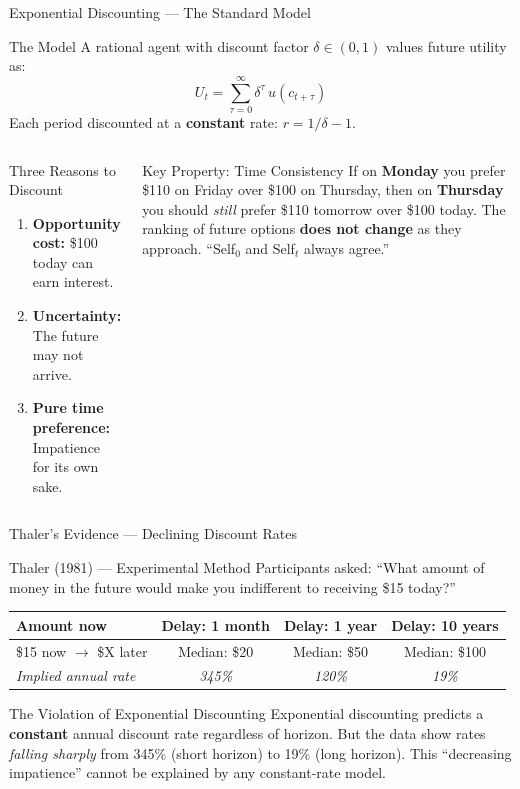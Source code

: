 \documentclass[aspectratio=169]{beamer}
\begin{document}
\begin{frame}{Exponential Discounting --- The Standard Model}
\begin{block}{The Model}
A rational agent with discount factor $\delta \in (0,1)$ values future utility as:
\[
  U_t = \sum_{\tau=0}^{\infty} \delta^\tau \, u(c_{t+\tau})
\]
Each period discounted at a \textbf{constant} rate: $r = 1/\delta - 1$.
\end{block}
\begin{columns}
\begin{block}{Three Reasons to Discount}
\begin{enumerate}
  \item \textbf{Opportunity cost:} \$100 today can earn interest.
  \item \textbf{Uncertainty:} The future may not arrive.
  \item \textbf{Pure time preference:} Impatience for its own sake.
\end{enumerate}
\end{block}
\begin{block}{Key Property: Time Consistency}
If on \textbf{Monday} you prefer \$110 on Friday over \$100 on Thursday, then on \textbf{Thursday} you should \textit{still} prefer \$110 tomorrow over \$100 today. The ranking of future options \textbf{does not change} as they approach. ``Self$_0$ and Self$_t$ always agree.''
\end{block}
\end{columns}
\end{frame}

\begin{frame}{Thaler's Evidence --- Declining Discount Rates}
\begin{block}{Thaler (1981) --- Experimental Method}
Participants asked: ``What amount of money in the future would make you indifferent to receiving \$15 today?''
\end{block}
\medskip
\begin{center}
\begin{tabular}{lccc}
\toprule
\textbf{Amount now} & \textbf{Delay: 1 month} & \textbf{Delay: 1 year} & \textbf{Delay: 10 years}\\
\midrule
\$15 now $\to$ \$X later & Median: \$20 & Median: \$50 & Median: \$100\\[0.3em]
\textit{Implied annual rate} & \textit{345\%} & \textit{120\%} & \textit{19\%}\\
\bottomrule
\end{tabular}
\end{center}
\medskip
\begin{alertblock}{The Violation of Exponential Discounting}
Exponential discounting predicts a \textbf{constant} annual discount rate regardless of horizon. But the data show rates \textit{falling sharply} from 345\% (short horizon) to 19\% (long horizon). This \alert{``decreasing impatience''} cannot be explained by any constant-rate model.
\end{alertblock}
\end{frame}
\end{document}
